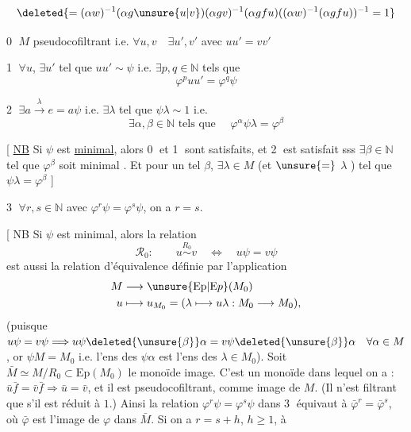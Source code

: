 
\[
\deleted{=(\alpha w)^{-1}(\alpha g\unsure{u|v})(\alpha gv)^{-1}(\alpha gfu)
 ((\alpha w)^{-1}(\alpha gfu))^{-1}=1}
\]

\textcircled{0} $M$ pseudocofiltrant i.e. $\forall u,v\quad\exists u',v'$ avec $uu'=vv'$

\textcircled{1} $\forall u$, $\exists u'$ tel que $uu'\sim\psi$ i.e. $\exists p,q\in\mathbb N$ tels que
\[
\varphi^p uu'=\varphi^q\psi
\]

\textcircled{2} $\exists a\xrightarrow{\lambda}e=a\psi$ i.e. $\exists\lambda$ tel que $\psi\lambda\sim1$ i.e.
\[
\exists\alpha,\beta\in\mathbb N\text{ tels que }\quad\boxed{\varphi^\alpha\psi\lambda=\varphi^\beta}
\]

[ \uline{NB} Si $\psi$ est \uline{minimal}, alors \textcircled{0} et \textcircled{1} sont
satisfaits, et \textcircled{2} est satisfait sss 
$\exists\beta\in\mathbb N$ tel que $\varphi^\beta$ soit minimal . Et
pour un tel $\beta$, $\exists\lambda\in M$ (et $\unsure{=} $ $\lambda$ )
tel que $\psi\lambda=\varphi^\beta$ ]

\textcircled{3} $\forall r,s\in\mathbb N$ avec $\varphi^r\psi=\varphi^s\psi$, on a $r=s$.

[ NB Si $\psi$ est minimal, alors la relation
\[
\mathscr R_0:\qquad u\overset{R_0}{\sim}v\quad\Longleftrightarrow\quad u\psi=v\psi
\]
est aussi la relation d'équivalence définie par
l'application
\[
\begin{aligned}
M&\longrightarrow \unsure{\mathrm{Ep}|\mathrm{E}p}(M_0)\\
u&\longmapsto u_{M_0}=(\lambda\longmapsto u\lambda:M_0\longrightarrow M_0),
\end{aligned}
\]
(puisque $u\psi=v\psi\Longrightarrow u\psi\deleted{\unsure{\beta}}\alpha=v\psi\deleted{\unsure{\beta}}\alpha\quad\forall\alpha\in M$,
or $\psi M=M_0$ i.e. l'ens des $\psi\alpha$ est l'ens des
$\lambda\in M_0$). Soit $\bar M\simeq M/R_0\subset\mathrm{Ep}(M_0)$ le
monoïde image.  C'est un monoïde
dans lequel on a : $\bar u\bar f=\bar v\bar f\Longrightarrow\bar u=\bar v$, et
il est pseudocofiltrant, comme image de
$M$. (Il n'est filtrant que s'il est réduit à $1$.)
Ainsi la relation $\varphi^r\psi=\varphi^s\psi$ dans \textcircled{3} équivaut
à $\bar\varphi^r=\bar\varphi^s$, où $\bar\varphi$ est l'image de $\varphi$ dans $\bar M$.
Si on a $r=s+h$, $h\geq1$,   à

